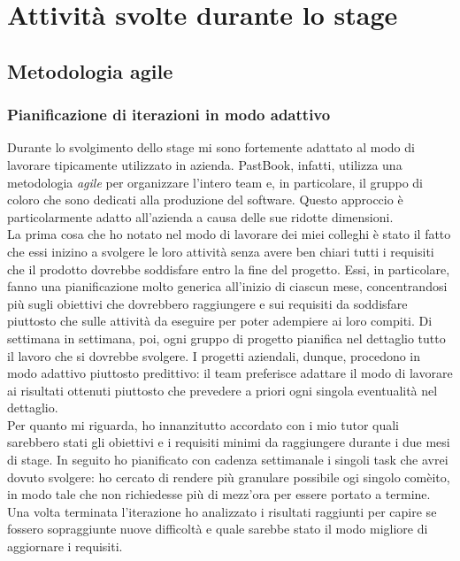 \chapter{Attività svolte durante lo stage}
	\section{Metodologia agile}
		\subsection{Pianificazione di iterazioni in modo adattivo}
			Durante lo svolgimento dello stage mi sono fortemente adattato al modo di lavorare tipicamente utilizzato in azienda.
			PastBook, infatti, utilizza una metodologia \emph{agile} per organizzare l'intero team e, in particolare, il gruppo di coloro
			che sono dedicati alla produzione del software. Questo approccio è particolarmente adatto all'azienda a causa delle sue
			ridotte dimensioni.\\
			La prima cosa che ho notato nel modo di lavorare dei miei colleghi è stato il fatto che essi inizino a svolgere le loro
			attività senza avere ben chiari tutti i requisiti che il prodotto dovrebbe soddisfare entro la fine del progetto.
			Essi, in particolare, fanno una pianificazione molto generica all'inizio di ciascun mese, concentrandosi più sugli
			obiettivi che dovrebbero raggiungere e sui requisiti da soddisfare piuttosto che sulle attività da eseguire per poter
			adempiere ai loro compiti. Di settimana in settimana, poi, ogni gruppo di progetto pianifica nel dettaglio tutto il lavoro
			che si dovrebbe svolgere. I progetti aziendali, dunque, procedono in modo adattivo piuttosto predittivo: il team preferisce
			adattare il modo di lavorare ai risultati ottenuti piuttosto che prevedere a priori ogni singola eventualità nel dettaglio.\\
			Per quanto mi riguarda, ho innanzitutto accordato con i mio tutor quali sarebbero stati gli obiettivi e i requisiti minimi
			da raggiungere durante i due mesi di stage. In seguito ho pianificato con cadenza settimanale i singoli task che avrei
			dovuto svolgere: ho cercato di rendere più granulare possibile ogi singolo comèito, in modo tale che non richiedesse più di
			mezz'ora per essere portato a termine. Una volta terminata l'iterazione ho analizzato i risultati raggiunti per capire se
			fossero sopraggiunte nuove difficoltà e quale sarebbe stato il modo migliore di aggiornare i requisiti.
